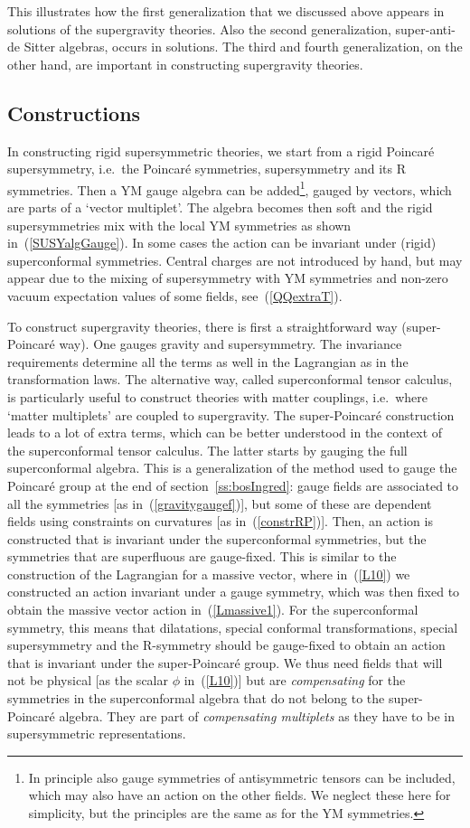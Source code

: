 \documentclass[a4paper,11pt,twoside]{article}
\begin{document}
This illustrates how the first generalization that we discussed above
appears in solutions of the supergravity theories. Also the second
generalization, super-anti-de Sitter algebras, occurs in solutions. The
third and fourth generalization, on the other hand, are important in
constructing supergravity theories.
\subsection{Constructions}\label{ss:construction}
In constructing rigid supersymmetric theories, we start from a rigid
Poincar{\'e} supersymmetry, i.e.\ the Poincar{\'e} symmetries, supersymmetry and
its R symmetries. Then a YM gauge algebra can be added\footnote{In
principle also gauge symmetries of antisymmetric tensors can be included,
which may also have an action on the other fields. We neglect these here
for simplicity, but the principles are the same as for the YM
symmetries.}, gauged by vectors, which are parts of a `vector multiplet'.
The algebra becomes then soft and the rigid supersymmetries mix with the
local YM symmetries as shown in~(\ref{SUSYalgGauge}). In some cases the
action can be invariant under (rigid) superconformal symmetries. Central
charges are not introduced by hand, but may appear due to the mixing of
supersymmetry with YM symmetries and non-zero vacuum expectation values
of some fields, see~(\ref{QQextraT}).


To construct supergravity theories, there is first a straightforward way
(super-Poincar{\'e} way). One gauges gravity and supersymmetry. The
invariance requirements determine all the terms as well in the Lagrangian
as in the transformation laws. The alternative way, called superconformal
tensor calculus, is particularly useful to construct theories with matter
couplings, i.e.\ where `matter multiplets' are coupled to supergravity.
The super-Poincar{\'e} construction leads to a lot of extra terms, which can
be better understood in the context of the superconformal tensor
calculus. The latter starts by gauging the full superconformal algebra.
This is a generalization of the method used to gauge the Poincar{\'e} group
at the end of section~\ref{ss:bosIngred}: gauge fields are associated to
all the symmetries [as in~(\ref{gravitygaugef})], but some of these are
dependent fields using constraints on curvatures [as
in~(\ref{constrRP})]. Then, an action is constructed that is invariant
under the superconformal symmetries, but the symmetries that are
superfluous are gauge-fixed. This is similar to the construction of the
Lagrangian for a massive vector, where in~(\ref{L10}) we constructed an
action invariant under a gauge symmetry, which was then fixed to obtain
the massive vector action in~(\ref{Lmassive1}). For the superconformal
symmetry, this means that dilatations, special conformal transformations,
special supersymmetry and the R-symmetry should be gauge-fixed to obtain
an action that is invariant under the super-Poincar{\'e} group. We thus need
fields that will not be physical [as the scalar $\phi $ in~(\ref{L10})]
but are \emph{compensating} for the symmetries in the superconformal
algebra that do not belong to the super-Poincar{\'e} algebra. They are part
of \emph{compensating multiplets} as they have to be in supersymmetric
representations.
\end{document}
